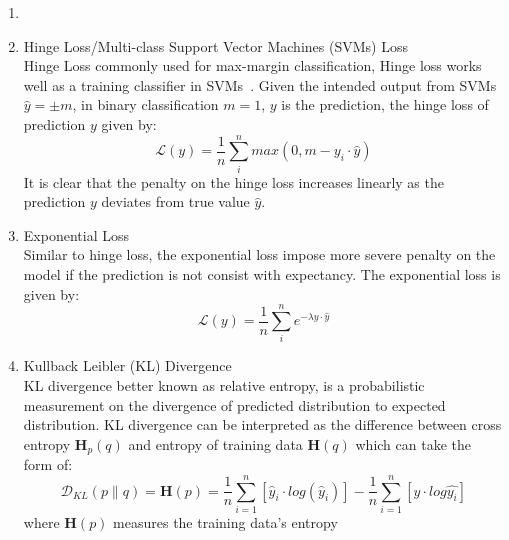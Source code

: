 \begin{enumerate}
    \item 
    \item Hinge Loss/Multi-class Support Vector Machines (SVMs) Loss \\
Hinge Loss commonly used for max-margin classification, Hinge loss works well as a training classifier in SVMs~\cite{Cortes_1995}. Given the intended output from SVMs $\hat{y} = \pm m$, in binary classification $m = 1$, $y$ is the prediction, the hinge loss of prediction $y$ given by:
\begin {equation}
    \mathcal{L}(y) = \frac {1}{n} \sum_i^n max(0,m - y_i \cdot \hat{y})
\end{equation}
It is clear that the penalty on the hinge loss increases linearly as the prediction $y$ deviates from true value $\hat{y}$.
    \item Exponential Loss \\
Similar to hinge loss, the exponential loss impose more severe penalty on the model if the prediction is not consist with expectancy. The exponential loss is given by:
\begin {equation}
    \mathcal{L}(y) = \frac {1}{n} \sum_i^n e^{-\lambda y \cdot \hat{y}}
\end{equation}
    \item Kullback Leibler (KL) Divergence\\
KL divergence better known as relative entropy, is a probabilistic measurement on the divergence of predicted distribution to expected distribution. KL divergence can be interpreted as the difference between cross entropy $\mathbf{H}_p(q)$ and entropy of training data $\mathbf{H}(q)$ which can take the form of:
\begin{equation}
    \mathcal{D}_{KL}(p \parallel q) = \mathbf{H}(p)  = \frac{1}{n}\sum_{i=1}^n [\hat{y}_i \cdot log(\hat{y}_i)] -\frac{1}{n}\sum_{i=1}^n [y \cdot log\hat{y_i}]
\end{equation}
where $\mathbf{H}(p)$ measures the training data's entropy
\end {enumerate}

